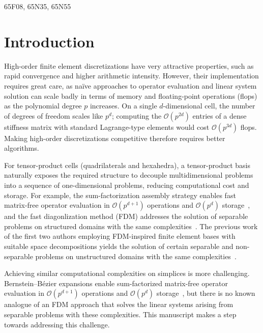 \documentclass[review,onefignum,onetabnum,a4paper]{siamart190516}
\begin{document}
\begin{AMS}
   65F08, 65N35, 65N55
\end{AMS}


\section{Introduction} \label{sec:introduction}

High-order finite element discretizations have very attractive properties, such as rapid convergence and higher arithmetic intensity. However, their implementation requires great care, as na\"ive approaches to operator evaluation and linear system solution can scale badly in terms of memory and floating-point operations (flops) as the polynomial degree $p$ increases. On a single $d$-dimensional cell, the number of degrees of freedom scales like $p^d$; computing the $\mathcal{O}(p^{2d})$ entries of a dense stiffness matrix with standard Lagrange-type elements would cost $\mathcal{O}(p^{3d})$ flops. Making high-order discretizations competitive therefore requires better algorithms.

For tensor-product cells (quadrilaterals and hexahedra), a tensor-product basis naturally exposes the required structure to decouple multidimensional problems into a sequence of one-dimensional problems, reducing computational cost and storage. For example, the sum-factorization assembly strategy enables fast matrix-free operator evaluation in $\mathcal{O}(p^{d+1})$ operations and $\mathcal{O}(p^{d})$ storage~\cite{orszag80}, and the fast diagonlization method (FDM) addresses the solution of separable problems on structured domains with the same complexities~\cite{lynch64}. The previous work of the first two authors employing FDM-inspired finite element bases with suitable space decompositions yields the solution of certain separable and non-separable problems on unstructured domains with the same complexities~\cite{brubeck22,brubeck24}.

Achieving similar computational complexities on simplices is more challenging. Bernstein--B\'ezier expansions enable sum-factorized matrix-free operator evaluation in $\mathcal{O}(p^{d+1})$ operations and $\mathcal{O}(p^{d})$ storage~\cite{ainsworth11}, but there is no known analogue of an FDM approach that solves the linear systems arising from separable problems with these complexities. This manuscript makes a step towards addressing this challenge.
\end{document}
